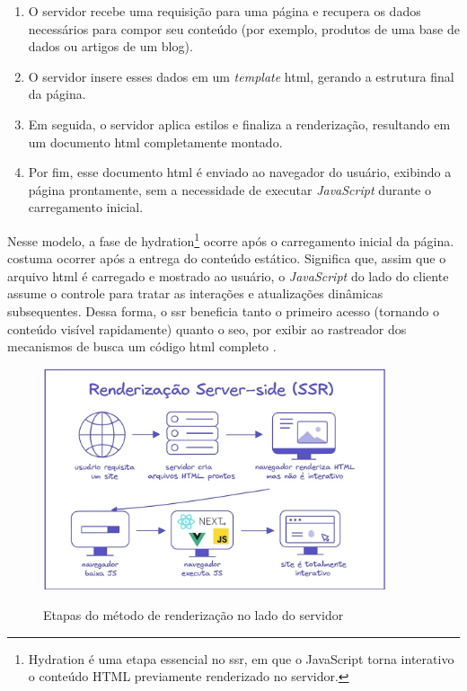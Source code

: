 \begin{enumerate}
    \item O servidor recebe uma requisição para uma página e recupera os dados necessários para compor seu conteúdo (por exemplo, produtos de uma base de dados ou artigos de um blog).
    \item O servidor insere esses dados em um \emph{template} \acrshort{html}, gerando a estrutura final da página.
    \item Em seguida, o servidor aplica estilos e finaliza a renderização, resultando em um documento \acrshort{html} completamente montado.
    \item Por fim, esse documento \acrshort{html} é enviado ao navegador do usuário, exibindo a página prontamente, sem a necessidade de executar \emph{JavaScript} durante o carregamento inicial.
\end{enumerate}

Nesse modelo, a fase de hydration\footnote{Hydration é uma etapa essencial no \acrshort{ssr}, em que o JavaScript torna interativo o conteúdo HTML previamente renderizado no servidor.} ocorre após o carregamento inicial da página. costuma ocorrer após a entrega do conteúdo estático. Significa que, assim que o arquivo \acrshort{html} é carregado e mostrado ao usuário, o \emph{JavaScript} do lado do cliente assume o controle para tratar as interações e atualizações dinâmicas subsequentes. Dessa forma, o \acrshort{ssr} beneficia tanto o primeiro acesso (tornando o conteúdo visível rapidamente) quanto o \acrshort{seo}, por exibir ao rastreador dos mecanismos de busca um código \acrshort{html} completo \cite{atori2024}.

\begin{figure}[h!]
    \centering
    \caption{Etapas do método de renderização no lado do servidor}
    \includegraphics[width=0.9\textwidth]{media/server_side_rendering.jpeg}
    \label{fig:server_side_rendering}
\end{figure}

